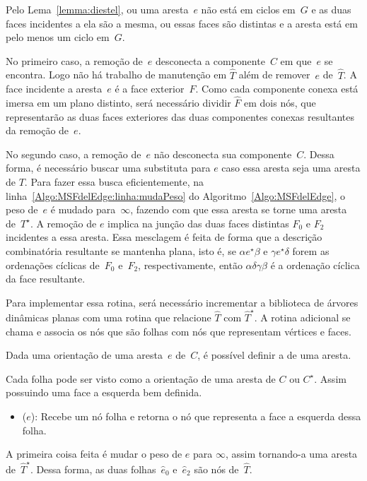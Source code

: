 Pelo Lema~\ref{lemma:diestel}, ou uma aresta~$e$ não está em ciclos em~$G$ e as duas faces incidentes a ela são a mesma, ou essas faces são distintas e a aresta está em pelo menos um ciclo em~$G$.

No primeiro caso, a remoção de~$e$ desconecta a componente~$C$ em que~$e$ se encontra.
Logo não há trabalho de manutenção em $\hat T$ além de remover~$e$ de~$\hat T$.
A face incidente a aresta~$e$ é a face exterior~$F$.
Como cada componente conexa está imersa em um plano distinto, será necessário dividir $\hat F$ em dois nós, que representarão as duas faces exteriores das duas componentes conexas resultantes da remoção de~$e$.


No segundo caso, a remoção de~$e$ não desconecta sua componente~$C$.
Dessa forma, é necessário buscar uma substituta para $e$ caso essa aresta seja uma aresta de $T$.
Para fazer essa busca eficientemente, na linha~\ref{Algo:MSFdelEdge:linha:mudaPeso} do Algoritmo~\ref{Algo:MSFdelEdge}, o peso de~$e$ é mudado para~$\infty$, fazendo com que essa aresta se torne uma aresta de~$T^\star$. 
A remoção de $e$ implica na junção das duas faces distintas $F_0$ e $F_2$ incidentes a essa aresta.
Essa mesclagem é feita de forma que a descrição combinatória resultante se mantenha plana, isto é, se $\alpha e^\star \beta$ e $\gamma e^\star \delta$ forem as ordenações cíclicas de~$F_0$ e~$F_2$, respectivamente, então $\alpha \delta\gamma\beta$ é a ordenação cíclica da face resultante.

Para implementar essa rotina, será necessário incrementar a biblioteca de árvores dinâmicas planas com uma rotina que relacione $\hat T$ com $\hat T^\star$.
A rotina adicional se chama \LCOLeftFace{} e associa os nós que são folhas com nós que representam vértices e faces.

Dada uma orientação de uma aresta~$e$ de~$C$, é possível definir a  de uma aresta.

Cada folha pode ser visto como a orientação de uma aresta de $C$ ou $C^\star$.
Assim possuindo uma face a esquerda bem definida.

\begin{itemize}
\item \LCOLeftFace($e$): Recebe um nó folha e retorna o nó que representa a face a esquerda dessa folha.
\end{itemize}

A primeira coisa feita é mudar o peso de $e$ para $\infty$, assim tornando-a uma aresta de~$\hat T^\star$.
Dessa forma, as duas folhas~$\hat e_0$ e~$\hat e_2$ são nós de~$\hat T$.

